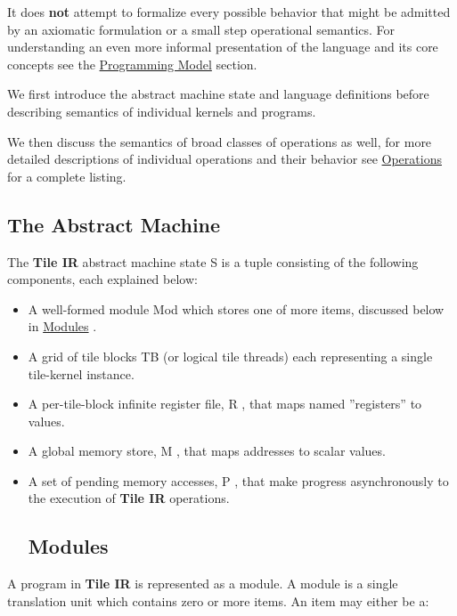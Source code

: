 \documentclass{article}
\begin{document}
It does \textbf{not} attempt to formalize every possible behavior that might be admitted by an axiomatic formulation or a small step operational semantics. For understanding an even more informal presentation of the language and its core concepts see the \href{https://docs.nvidia.com/cuda/tile-ir/latest/sections/prog_model.html#section-prog-model}{Programming Model} section.


We first introduce the abstract machine state and language definitions before describing semantics of individual kernels and programs.


We then discuss the semantics of broad classes of operations as well, for more detailed descriptions of individual operations and their behavior see \href{https://docs.nvidia.com/cuda/tile-ir/latest/sections/operations.html#section-operations}{Operations} for a complete listing.


\subsection{The Abstract Machine}

The \textbf{Tile IR} abstract machine state S is a tuple consisting of the following components, each explained below:


\begin{itemize}
\item A well-formed module Mod which stores one of more items, discussed below in \href{https://docs.nvidia.com/cuda/tile-ir/latest/sections/semantics.html#sub-sec-modules}{Modules} .
\item A grid of tile blocks TB (or logical tile threads) each representing a single tile-kernel instance.
\item A per-tile-block infinite register file, R , that maps named ''registers'' to values.
\item A global memory store, M , that maps addresses to scalar values.
\item A set of pending memory accesses, P , that make progress asynchronously to the execution of \textbf{Tile IR} operations.


\subsection{Modules}

\end{itemize}
A program in \textbf{Tile IR} is represented as a module. A module is a single translation unit which contains zero or more items. An item may either be a:
\end{document}
